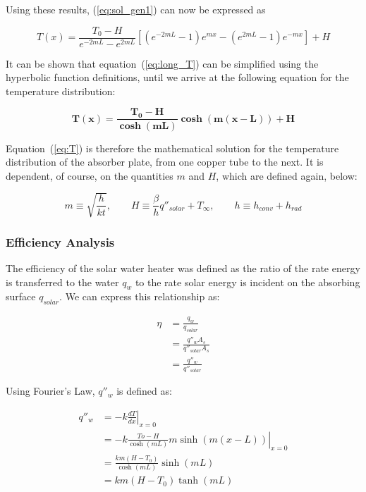 \documentclass[]{article}
\begin{document}
Using these results, (\ref{eq:sol_gen1}) can now be expressed as

\begin{equation} \label{eq:long_T}
T(x) = \frac{T_0 - H}{e^{-2mL} - e^{2mL}}[(e^{-2mL}-1)e^{mx} - (e^{2mL}-1)e^{-mx}] + H
\end{equation}

It can be shown that equation~(\ref{eq:long_T}) can be simplified using the hyperbolic function definitions, until we arrive at the following equation for the temperature distribution:

\begin{equation} \label{eq:T}
\boldsymbol{T(x) = \frac{T_0 - H}{\cosh(mL)}\cosh(m(x-L)) + H}
\end{equation}

Equation~(\ref{eq:T}) is therefore the mathematical solution for the temperature distribution of the absorber plate, from one copper tube to the next. It is dependent, of course, on the quantities $m$ and $H$, which are defined again, below:

\begin{equation} \label{eq:coeffs}
m \equiv \sqrt{\frac{h}{kt}}, \qquad
H \equiv \frac{\beta}{h}q''_{solar} + T_{\infty}, \qquad
h \equiv h_{conv} + h_{rad}
\end{equation}

\subsubsection{Efficiency Analysis}

The efficiency of the solar water heater was defined as the ratio of the rate energy is transferred to the water $q_w$ to the rate solar energy is incident on the absorbing surface $q_{solar}$. We can express this relationship as:

\begin{equation} \label{eq:eff1}
\begin{split}
\eta & = \frac{q_w}{q_{solar}} \\
& = \frac{q''_w A_s}{q''_{solar} A_s} \\
& = \frac{q''_w}{q''_{solar}}
\end{split}
\end{equation}

Using Fourier's Law, $q''_w$ is defined as:

\begin{equation} \label{eq:q"w}
\begin{split}
q''_w & = \left. -k \frac{dT}{dx} \right|_{x=0} \\
& = \left.-k\frac{To-H}{\cosh(mL)}m\sinh(m(x-L)) \right|_{x=0} \\
& = \frac{km(H-T_0)}{\cosh(mL)}\sinh(mL) \\
& = km(H-T_0)\tanh(mL)
\end{split}
\end{equation}
\end{document}
